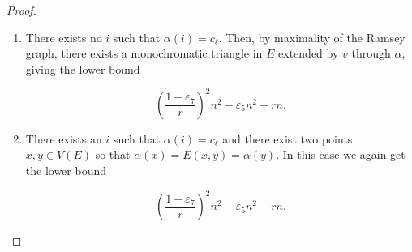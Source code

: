 \documentclass[a4paper,11pt]{article}
\numberwithin{equation}{section}
\begin{document}
\begin{proof}
\begin{enumerate}





        \item  There exists no $i$ such that $\alpha(i)=c_\ell$. Then, by maximality of the Ramsey graph, there exists a monochromatic triangle in $E$ extended by $v$ through $\alpha$, giving the lower bound
        
    \begin{equation}
        \label{eq:tvbLower_2}
        \left(\frac{1-\varepsilon_7}{r}\right)^2n^2 - \varepsilon_5n^2-rn.
    \end{equation}
    


        \item \label{enum:case_3_alg} There exists an $i$ such that $\alpha(i)=c_\ell$ and there exist two points $x,y\in V(E)$ so that $\alpha(x)=E(x,y)=\alpha(y)$. In this case we again get the lower bound
    
    \begin{equation}
        \label{eq:tvbLower_3}
        \left(\frac{1-\varepsilon_7}{r}\right)^2 n^2-\varepsilon_5n^2-rn.
    \end{equation}
    


\end{enumerate}
\end{proof}
\end{document}
